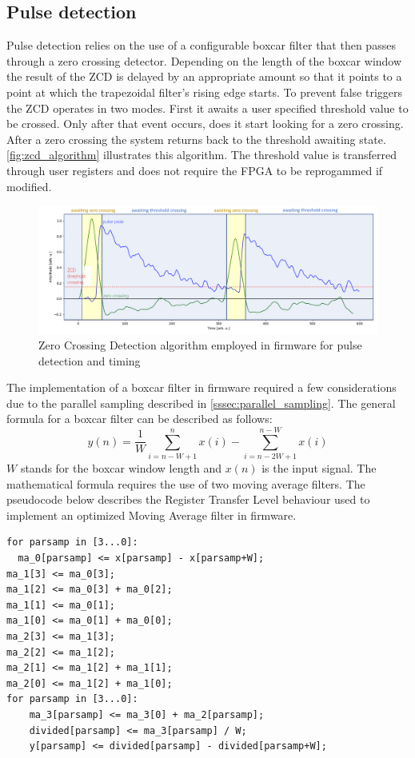 \subsection{Pulse detection}
Pulse detection relies on the use of a configurable boxcar filter
that then passes through a zero crossing detector. Depending on the
length of the boxcar window the result of the ZCD is delayed by an appropriate
amount so that it points to a point at which the trapezoidal filter's 
rising edge starts. To prevent false triggers the ZCD operates in two modes.
First it awaits a user specified threshold value to be crossed. Only after
that event occurs, does it start looking for a zero crossing.
After a zero crossing the system returns back to the threshold awaiting state.
\autoref{fig:zcd_algorithm} illustrates this algorithm. 
The threshold value is transferred through user registers and does not require
the FPGA to be reprogammed if modified.

\begin{figure}[H]
  \centering
  \includegraphics[width=\linewidth]{media/zcd_algorithm.png}
  \caption{Zero Crossing Detection algorithm employed in firmware for pulse detection and timing}
  \label{fig:zcd_algorithm} 
\end{figure}


The implementation of a boxcar filter in firmware required a few considerations
due to the parallel sampling described in \autoref{sssec:parallel_sampling}.
The general formula for a boxcar filter can be described as follows:
$$y(n) = \frac{1}{W} \sum^n_{i=n-W+1}x(i) - \sum^{n-W}_{i=n-2W+1}x(i)$$
$W$ stands for the boxcar window length and $x(n)$ is the input signal.
The mathematical formula requires the use of two moving average filters.
The pseudocode below describes the Register Transfer Level behaviour 
used to implement an optimized Moving Average filter in firmware.

\begin{lstlisting}
for parsamp in [3...0]:
  ma_0[parsamp] <= x[parsamp] - x[parsamp+W];
ma_1[3] <= ma_0[3];
ma_1[2] <= ma_0[3] + ma_0[2];
ma_1[1] <= ma_0[1];
ma_1[0] <= ma_0[1] + ma_0[0];
ma_2[3] <= ma_1[3];
ma_2[2] <= ma_1[2];
ma_2[1] <= ma_1[2] + ma_1[1];
ma_2[0] <= ma_1[2] + ma_1[0];
for parsamp in [3...0]:
	ma_3[parsamp] <= ma_3[0] + ma_2[parsamp];
	divided[parsamp] <= ma_3[parsamp] / W;
	y[parsamp] <= divided[parsamp] - divided[parsamp+W];
\end{lstlisting}


